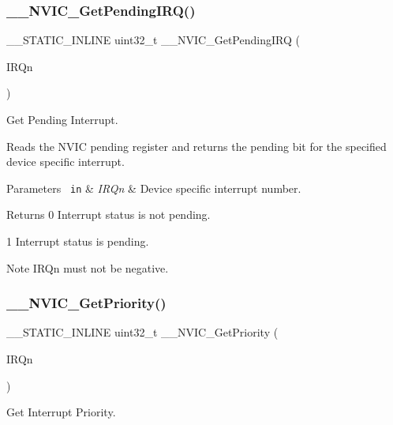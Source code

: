 \subsubsection{\texorpdfstring{\_\_NVIC\_GetPendingIRQ()}{\_\_NVIC\_GetPendingIRQ()}}
{\footnotesize\ttfamily \+\_\+\+\_\+\+S\+T\+A\+T\+I\+C\+\_\+\+I\+N\+L\+I\+NE uint32\+\_\+t \+\_\+\+\_\+\+N\+V\+I\+C\+\_\+\+Get\+Pending\+I\+RQ (\begin{DoxyParamCaption}\item[{I\+R\+Qn\+\_\+\+Type}]{I\+R\+Qn }\end{DoxyParamCaption})}



Get Pending Interrupt. 

Reads the N\+V\+IC pending register and returns the pending bit for the specified device specific interrupt. 
\begin{DoxyParams}[1]{Parameters}
\mbox{\texttt{ in}}  & {\em I\+R\+Qn} & Device specific interrupt number. \\
\hline
\end{DoxyParams}
\begin{DoxyReturn}{Returns}
0 Interrupt status is not pending. 

1 Interrupt status is pending. 
\end{DoxyReturn}
\begin{DoxyNote}{Note}
I\+R\+Qn must not be negative. 
\end{DoxyNote}
\mbox{\label{group___c_m_s_i_s___core___n_v_i_c_functions_gaeb9dc99c8e7700668813144261b0bc73}} 
\subsubsection{\texorpdfstring{\_\_NVIC\_GetPriority()}{\_\_NVIC\_GetPriority()}}
{\footnotesize\ttfamily \+\_\+\+\_\+\+S\+T\+A\+T\+I\+C\+\_\+\+I\+N\+L\+I\+NE uint32\+\_\+t \+\_\+\+\_\+\+N\+V\+I\+C\+\_\+\+Get\+Priority (\begin{DoxyParamCaption}\item[{I\+R\+Qn\+\_\+\+Type}]{I\+R\+Qn }\end{DoxyParamCaption})}



Get Interrupt Priority. 

